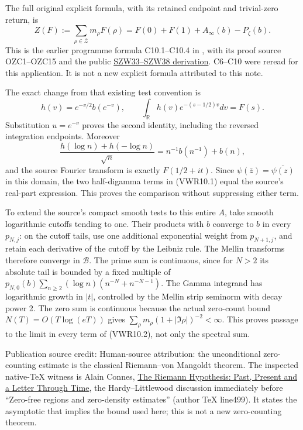 The full original explicit formula, with its retained endpoint and
trivial-zero return, is \[
Z(F):=\sum_{\rho\in\mathscr Z}m_\rho F(\rho)
=F(0)+F(1)+A_\infty(b)-P_\zeta(b).
\tag{VWR10.2}
\] This is the earlier programme formula C10.1--C10.4 in
\href{https://github.com/KokunoYumeto/zeta-function-research-reader/blob/36a82ecca98addb8a98b48204e349737856c7223/workbenches/splitzero-tandem/continuations/20260924-cohomology-weight-and-character-lifts/gct-weight-control/proofs/TAU_TWISTOR_TATE_AND_WEIL.md}{},
with its proof source OZC1--OZC15 and the public
\href{https://github.com/KokunoYumeto/zeta-function-research-reader/blob/76f421965914beb133df797835f940849844dc4f/workbenches/splitzero-tandem/branches/tau-zero-prime-positivity/SUPPORTED_ZERO_PRIME_WEIL_DERIVATION.md}{SZW33--SZW38
derivation}. C6--C10 were reread for this application. It is not a new
explicit formula attributed to this note.

The exact change from that existing test convention is \[
h(v)=e^{-v/2}b(e^{-v}),\qquad
\int_{\mathbb R}h(v)e^{-(s-1/2)v}dv=F(s).
\tag{VWR10.3}
\] Substitution \(u=e^{-v}\) proves the second identity, including the
reversed integration endpoints. Moreover \[
\frac{h(\log n)+h(-\log n)}{\sqrt n}
=n^{-1}b(n^{-1})+b(n),
\] and the source Fourier transform is exactly \(F(1/2+it)\). Since
\(\psi(\bar z)=\overline{\psi(z)}\) in this domain, the two half-digamma
terms in (VWR10.1) equal the source's real-part expression. This proves
the comparison without suppressing either term.

To extend the source's compact smooth tests to this entire \(A\), take
smooth logarithmic cutoffs tending to one. Their products with \(b\)
converge to \(b\) in every \(p_{N,j}\): on the cutoff tails, use one
additional exponential weight from \(p_{N+1,j}\), and retain each
derivative of the cutoff by the Leibniz rule. The Mellin transforms
therefore converge in \(\mathcal B\). The prime sum is continuous, since
for \(N>2\) its absolute tail is bounded by a fixed multiple of
\(p_{N,0}(b)\sum_{n\ge2}(\log n)(n^{-N}+n^{-N-1})\). The Gamma integrand
has logarithmic growth in \(|t|\), controlled by the Mellin strip
seminorm with decay power 2. The zero sum is continuous because the
actual zero-count bound \(N(T)=O(T\log(eT))\) gives
\(\sum_\rho m_\rho(1+|\Im\rho|)^{-2}<\infty\). This proves passage to
the limit in every term of (VWR10.2), not only the spectral sum.

Publication source credit: Human-source attribution: the unconditional
zero-counting estimate is the classical Riemann--von Mangoldt theorem.
The inspected native-TeX witness is Alain Connes,
\href{https://arxiv.org/abs/2602.04022v1}{The Riemann Hypothesis: Past,
Present and a Letter Through Time}, the Hardy--Littlewood discussion
immediately before ``Zero-free regions and zero-density estimates''
(author TeX line499). It states the asymptotic that implies the bound
used here; this is not a new zero-counting theorem.

